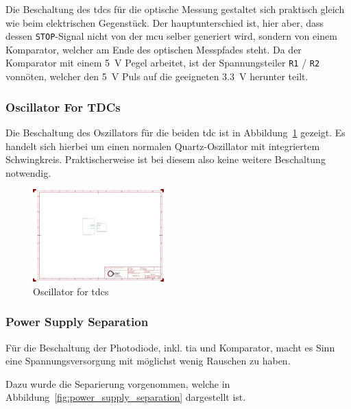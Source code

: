 Die Beschaltung des \acrshort{tdc}s für die optische Messung gestaltet sich praktisch gleich wie beim elektrischen
Gegenstück. Der hauptunterschied ist, hier aber, dass dessen \lstinline|STOP|-Signal nicht von der \acrshort{mcu} selber generiert
wird, sondern von einem Komparator, welcher am Ende des optischen Messpfades steht. Da der Komparator mit einem 5~V Pegel
arbeitet, ist der Spannungsteiler \lstinline|R1| / \lstinline|R2| vonnöten, welcher den 5~V Puls auf die geeigneten 3.3~V
herunter teilt.

\subsubsection{Oscillator For TDCs}

Die Beschaltung des Oszillators für die beiden \acrshort{tdc} ist in Abbildung~\ref{fig:oscillator_tdc} gezeigt. Es
handelt sich hierbei um einen normalen Quartz-Oszillator mit integriertem Schwingkreis. Praktischerweise ist bei diesem
also keine weitere Beschaltung notwendig.

\begin{figure}[H]
    \centering
    \includegraphics[page=2, trim=80 90 930 550, clip, width=0.45\textwidth]{attachments/schematic.pdf}
    \caption{Oscillator for \acrshort{tdc}s}\label{fig:oscillator_tdc}
\end{figure}

\subsubsection{Power Supply Separation}

Für die Beschaltung der Photodiode, inkl. \acrshort{tia} und Komparator, macht es Sinn eine Spannungsversorgung mit
möglichst wenig Rauschen zu haben.

Dazu wurde die Separierung vorgenommen, welche in Abbildung~\ref{fig:power_supply_separation} dargestellt ist.

